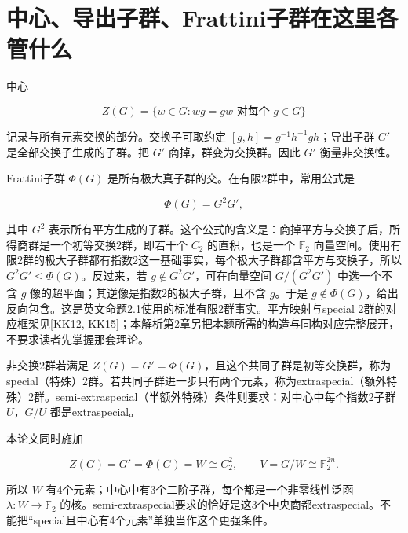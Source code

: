 \documentclass[UTF8,fontset=fandol,zihao=-4,openany,oneside]{ctexbook}
\begin{document}
\section{中心、导出子群、Frattini子群在这里各管什么}


中心



\[
Z(G)=\{w\in G:wg=gw\text{ 对每个 }g\in G\}
\]



记录与所有元素交换的部分。交换子可取约定 \([g,h]=g^{-1}h^{-1}gh\)；导出子群 \(G'\) 是全部交换子生成的子群。把 \(G'\) 商掉，群变为交换群。因此 \(G'\) 衡量非交换性。



Frattini子群 \(\Phi(G)\) 是所有极大真子群的交。在有限2群中，常用公式是



\[
\Phi(G)=G^2G',
\]



其中 \(G^2\) 表示所有平方生成的子群。这个公式的含义是：商掉平方与交换子后，所得商群是一个初等交换2群，即若干个 \(C_2\) 的直积，也是一个 \(\mathbb F_2\) 向量空间。使用有限2群的极大子群都有指数2这一基础事实，每个极大子群都含平方与交换子，所以 \(G^2G'\le\Phi(G)\)。反过来，若 \(g\notin G^2G'\)，可在向量空间 \(G/(G^2G')\) 中选一个不含 \(g\) 像的超平面；其逆像是指数2的极大子群，且不含 \(g\)。于是 \(g\notin\Phi(G)\)，给出反向包含。这是英文命题2.1使用的标准有限2群事实。平方映射与special 2群的对应框架见[KK12, KK15]；本解析第2章另把本题所需的构造与同构对应完整展开，不要求读者先掌握那套理论。



非交换2群若满足 \(Z(G)=G'=\Phi(G)\)，且这个共同子群是初等交换群，称为special（特殊）2群。若共同子群进一步只有两个元素，称为extraspecial（额外特殊）2群。semi-extraspecial（半额外特殊）条件则要求：对中心中每个指数2子群 \(U\)，\(G/U\) 都是extraspecial。



本论文同时施加



\[
Z(G)=G'=\Phi(G)=W\cong C_2^2,\qquad V=G/W\cong\mathbb F_2^{2n}.
\tag{英文(1.1)}
\]



所以 \(W\) 有4个元素；中心中有3个二阶子群，每个都是一个非零线性泛函 \(\lambda:W\to\mathbb F_2\) 的核。semi-extraspecial要求的恰好是这3个中央商都extraspecial。不能把“special且中心有4个元素”单独当作这个更强条件。
\end{document}
